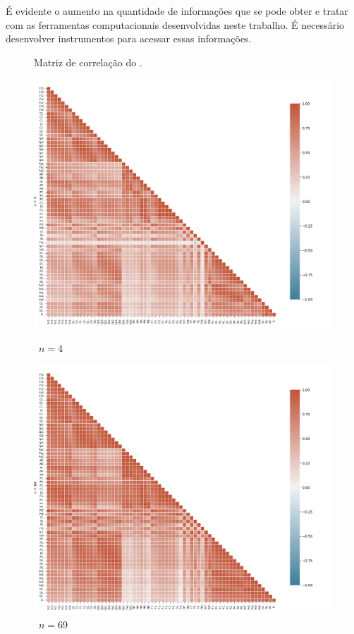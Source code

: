 É evidente o aumento na quantidade de informações que se pode obter e tratar com as ferramentas computacionais desenvolvidas neste trabalho. É necessário desenvolver instrumentos para acessar essas informações.

\begin{figure}[ht]
  \caption{Matriz de correlação do \pdcca.}
  \begin{minipage}[b]{0.45\textwidth}
    \includegraphics[width=\textwidth]{../Figures/test_dmc/pdcca4.png}
    \caption{\pdcca~$n = 4$}
  \end{minipage}
  \hfill
  \begin{minipage}[b]{0.45\textwidth}
    \includegraphics[width=\textwidth]{../Figures/test_dmc/pdcca69.png}
    \caption{\pdcca~$n = 69$}
  \end{minipage}
\end{figure}

